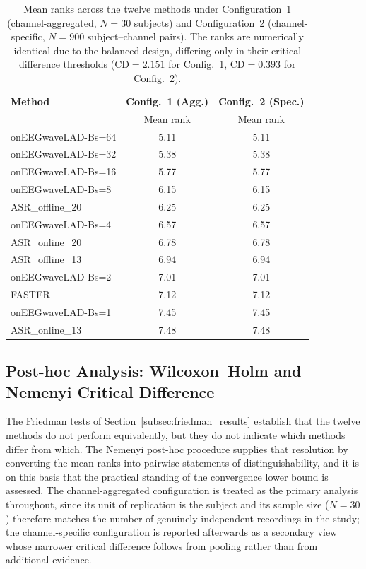 \documentclass[MScCS,12pt,oneside,final]{uccthesis}
\begin{document}
\begin{table}[!htb]
    \centering
    \begin{tabular}{lcc}
        \toprule
        \textbf{Method} & \textbf{Config.~1 (Agg.)} & \textbf{Config.~2 (Spec.)} \\
        & Mean rank & Mean rank \\
        \midrule
        onEEGwaveLAD-Bs=64 & 5.11 & 5.11 \\
        onEEGwaveLAD-Bs=32 & 5.38 & 5.38 \\
        onEEGwaveLAD-Bs=16 & 5.77 & 5.77 \\
        onEEGwaveLAD-Bs=8 & 6.15 & 6.15 \\
        ASR\_offline\_20 & 6.25 & 6.25 \\
        onEEGwaveLAD-Bs=4 & 6.57 & 6.57 \\
        ASR\_online\_20 & 6.78 & 6.78 \\
        ASR\_offline\_13 & 6.94 & 6.94 \\
        onEEGwaveLAD-Bs=2 & 7.01 & 7.01 \\
        FASTER & 7.12 & 7.12 \\
        onEEGwaveLAD-Bs=1 & 7.45 & 7.45 \\
        ASR\_online\_13 & 7.48 & 7.48 \\
        \bottomrule
    \end{tabular}
    \caption{Mean ranks across the twelve methods under Configuration~1 (channel-aggregated, $N = 30$ subjects) and Configuration~2 (channel-specific, $N = 900$ subject--channel pairs). The ranks are numerically identical due to the balanced design, differing only in their critical difference thresholds ($\mathrm{CD} = 2.151$ for Config.~1, $\mathrm{CD} = 0.393$ for Config.~2).}
    \label{tab:ranks_across_configs}
\end{table}

    \subsection{Post-hoc Analysis: Wilcoxon--Holm and Nemenyi Critical Difference}
\label{subsec:global_performance}

The Friedman tests of Section~\ref{subsec:friedman_results} establish that the twelve methods do not perform equivalently, but they do not indicate which methods differ from which. The Nemenyi post-hoc procedure supplies that resolution by converting the mean ranks into pairwise statements of distinguishability, and it is on this basis that the practical standing of the convergence lower bound is assessed. The channel-aggregated configuration is treated as the primary analysis throughout, since its unit of replication is the subject and its sample size ($N = 30$) therefore matches the number of genuinely independent recordings in the study; the channel-specific configuration is reported afterwards as a secondary view whose narrower critical difference follows from pooling rather than from additional evidence.
\end{document}
